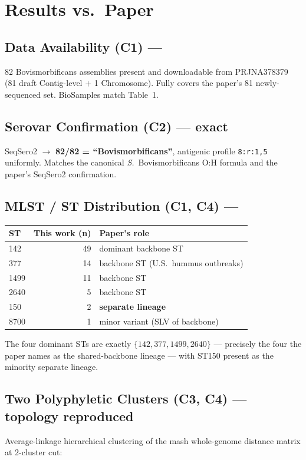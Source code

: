 \documentclass[11pt]{article}
\begin{document}
\section{Results vs.\ Paper}

\subsection{Data Availability (C1) --- \checkmark}
82 Bovismorbificans assemblies present and downloadable from PRJNA378379 (81 draft Contig-level $+$ 1 Chromosome). Fully covers the paper's 81 newly-sequenced set. BioSamples match Table~1.

\subsection{Serovar Confirmation (C2) --- \checkmark exact}
SeqSero2 $\rightarrow$ \textbf{82/82 = ``Bovismorbificans''}, antigenic profile \texttt{8:r:1,5} uniformly. Matches the canonical \emph{S.}\ Bovismorbificans O:H formula and the paper's SeqSero2 confirmation.

\subsection{MLST / ST Distribution (C1, C4) --- \checkmark}
\begin{center}
\begin{tabular}{lrl}
\toprule
ST & This work (n) & Paper's role \\
\midrule
142 & 49 & dominant backbone ST \\
377 & 14 & backbone ST (U.S.\ hummus outbreaks) \\
1499 & 11 & backbone ST \\
2640 & 5 & backbone ST \\
150 & 2 & \textbf{separate lineage} \\
8700 & 1 & minor variant (SLV of backbone) \\
\bottomrule
\end{tabular}
\end{center}
The four dominant STs are exactly $\{142, 377, 1499, 2640\}$ --- precisely the four the paper names as the shared-backbone lineage --- with ST150 present as the minority separate lineage.

\subsection{Two Polyphyletic Clusters (C3, C4) --- \checkmark topology reproduced}
Average-linkage hierarchical clustering of the mash whole-genome distance matrix at 2-cluster cut:
\end{document}
